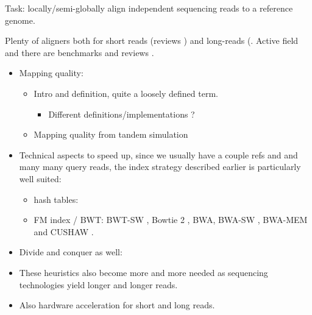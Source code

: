 \documentclass[
  11pt,
  twoside]{scrbook}
\providecommand{\tightlist}{%
  \setlength{\itemsep}{0pt}\setlength{\parskip}{0pt}}
\begin{document}
Task: locally/semi-globally align independent sequencing reads to a reference genome.

Plenty of aligners both for short reads (reviews \autocite{schbathMappingReadsGenomic2012,hatemBenchmarkingShortSequence2013,canzarShortReadMapping2017}) and long-reads (\autocite{liMinimap2PairwiseAlignment2018}. Active field and there are benchmarks \autocite{brindaRNFGeneralFramework2016} and reviews \autocite{alserTechnologyDictatesAlgorithms2021,ruffaloComparativeAnalysisAlgorithms2011}.

\begin{itemize}
\tightlist
\item
  Mapping quality:

  \begin{itemize}
  \item
    Intro and definition, quite a loosely defined term.

    \begin{itemize}
    \tightlist
    \item
      Different definitions/implementations ?
    \end{itemize}
  \item
    Mapping quality from tandem simulation \autocite{langmeadTandemSimulationFramework2017}
  \end{itemize}
\item
  Technical aspects to speed up, since we usually have a couple refs and and many many query reads, the index strategy described earlier is particularly well suited:

  \begin{itemize}
  \item
    hash tables: \autocite{liMinimap2PairwiseAlignment2018}
  \item
    FM index / BWT: BWT-SW \autocite{lamCompressedIndexingLocal2008}, Bowtie 2 \autocite{langmeadFastGappedreadAlignment2012}, BWA, BWA-SW \autocite{liFastAccurateShort2009,liFastAccurateLongread2010}, BWA-MEM \autocite{liAligningSequenceReads2013} and CUSHAW \autocite{liuLongReadAlignment2012}.
  \end{itemize}
\item
  Divide and conquer as well: \autocite{linKartDivideandconquerAlgorithm2017}
\item
  These heuristics also become more and more needed as sequencing technologies yield longer and longer reads.
\item
  Also hardware acceleration for short \autocite{olsonHardwareAccelerationShort2012} and long \autocite{chenAcceleratingNextGeneration2014,suzukiIntroducingDifferenceRecurrence2018,zeniLOGANHighPerformanceGPUBased2020} reads.
\end{itemize}
\end{document}
